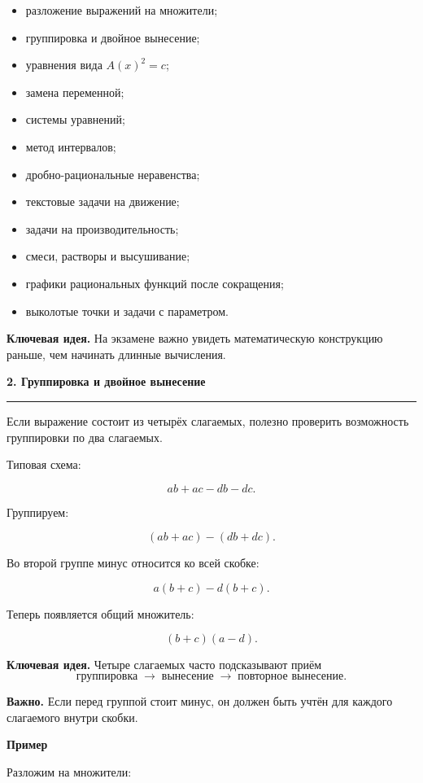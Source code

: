 \documentclass[a4paper,12pt]{article}
\newcommand{\topic}[1]{%
    \vspace{0.5em}
    {\Large\bfseries\textcolor{darkaccent}{#1}}\par
    \vspace{0.2em}
    {\color{accent}\rule{\linewidth}{0.7pt}}
    \vspace{0.5em}
}
\newcommand{\subtopic}[1]{%
    \vspace{0.5em}
    {\large\bfseries\textcolor{darkaccent}{#1}}\par
}
\newcommand{\keyidea}[1]{%
    \par\smallskip
    \textbf{\textcolor{darkaccent}{Ключевая идея.}} #1
    \par\smallskip
}
\newcommand{\warning}[1]{%
    \par\smallskip
    \textbf{\textcolor{accent}{Важно.}} #1
    \par\smallskip
}
\begin{document}
\begin{itemize}
    \item разложение выражений на множители;
    \item группировка и двойное вынесение;
    \item уравнения вида \(A(x)^2=c\);
    \item замена переменной;
    \item системы уравнений;
    \item метод интервалов;
    \item дробно-рациональные неравенства;
    \item текстовые задачи на движение;
    \item задачи на производительность;
    \item смеси, растворы и высушивание;
    \item графики рациональных функций после сокращения;
    \item выколотые точки и задачи с параметром.
\end{itemize}

\keyidea{
На экзамене важно увидеть математическую конструкцию раньше, чем начинать длинные вычисления.
}


\topic{2. Группировка и двойное вынесение}

Если выражение состоит из четырёх слагаемых, полезно проверить возможность группировки по два слагаемых.

Типовая схема:

\[
ab+ac-db-dc.
\]

Группируем:

\[
(ab+ac)-(db+dc).
\]

Во второй группе минус относится ко всей скобке:

\[
a(b+c)-d(b+c).
\]

Теперь появляется общий множитель:

\[
(b+c)(a-d).
\]

\keyidea{
Четыре слагаемых часто подсказывают приём
\[
\text{группировка}\;\longrightarrow\;
\text{вынесение}\;\longrightarrow\;
\text{повторное вынесение}.
\]
}

\warning{
Если перед группой стоит минус, он должен быть учтён для каждого слагаемого внутри скобки.
}

\subtopic{Пример}

Разложим на множители:
\end{document}
